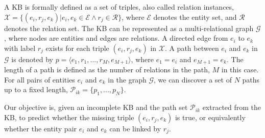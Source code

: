 \documentclass[letterpaper]{article} %
\begin{document}
A KB is formally defined as a set of triples, also called relation instances, $\mathcal{X} = \{ (e_i, r_j, e_k)|e_i, e_k\in \mathcal{E} \land  r_j \in \mathcal{R} \}$, where $\mathcal{E}$ denotes the entity set, and $\mathcal{R}$ denotes the relation set. The KB can be represented as a multi-relational graph $\mathcal{G}$, where nodes are entities and edges are relations. A directed edge from $e_i$ to $e_k$ with label $r_j$ exists for each triple $(e_i, r_j, e_k)$ in $\mathcal{X}$.
A path between $e_i$ and $e_k$ in $\mathcal{G}$ is denoted by $p = \langle e_1,r_1,...,r_M,e_{M+1}\rangle$, where $e_1 = e_i$ and $e_{M+1} = e_k$. The length of a path is defined as the number of relations in the path, $M$ in this case. For all pairs of entities $e_i$ and $e_k$ in the graph $\mathcal{G}$, we can discover a set of $N$ paths up to a fixed length, $\mathcal{P}_{ik} = \{ p_1,...,p_N \}$. 

Our objective is, given an incomplete KB and the path set $\mathcal{P}_{ik}$ extracted from the KB, to predict whether the missing triple $(e_i, r_j, e_k)$ is true, or equivalently whether the entity pair $e_i$ and $e_k$ can be linked by $r_j$. 

\end{document}
